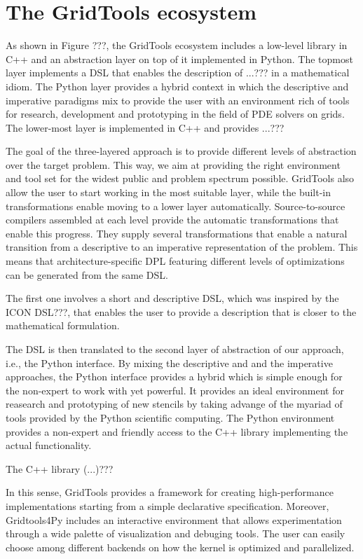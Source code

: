 \documentclass[english]{article}
\begin{document}
\section{The GridTools ecosystem}
As shown in Figure ???, the GridTools ecosystem includes a low-level library in C++ and an abstraction layer on top of it implemented in Python.
The topmost layer implements a DSL that enables the description of ...??? in a mathematical idiom.
The Python layer provides a hybrid context in which the descriptive and imperative paradigms mix to provide the user with an environment rich of tools for research, development and prototyping in the field of PDE solvers on grids.
The lower-most layer is implemented in C++ and provides ...???

The goal of the three-layered approach is to provide different levels of abstraction over the target problem. 
This way, we aim at providing the right environment and tool set for the widest public and problem spectrum possible.
GridTools also allow the user to start working in the most suitable layer, while the built-in transformations enable moving to a lower layer automatically.
Source-to-source compilers assembled at each level provide the automatic transformations that enable this progress.
They supply several transformations that enable a natural transition from a descriptive to an imperative representation of the problem.
This means that architecture-specific DPL featuring different levels of optimizations can be generated from the same DSL.

The first one involves a short and descriptive DSL, which was inspired by the ICON DSL???, that enables the user to provide a description that is closer to the mathematical formulation.

The DSL is then translated to the second layer of abstraction of our approach, i.e., the Python interface.
By mixing the descriptive and and the imperative approaches, the Python interface provides a hybrid which is simple enough for the non-expert to work with yet powerful.
It provides an ideal environment for reasearch and prototyping of new stencils by taking advange of the myariad of tools provided by the Python scientific computing.
The Python environment provides a non-expert and friendly access to the C++ library implementing the actual functionality.

The C++ library (...)???

In this sense, GridTools provides a framework for creating high-performance implementations starting from a simple declarative specification. 
Moreover, Gridtools4Py includes an interactive environment that allows experimentation through a wide palette of visualization and debuging tools.
The user can easily choose among different backends on how the kernel is optimized and parallelized.
\end{document}
